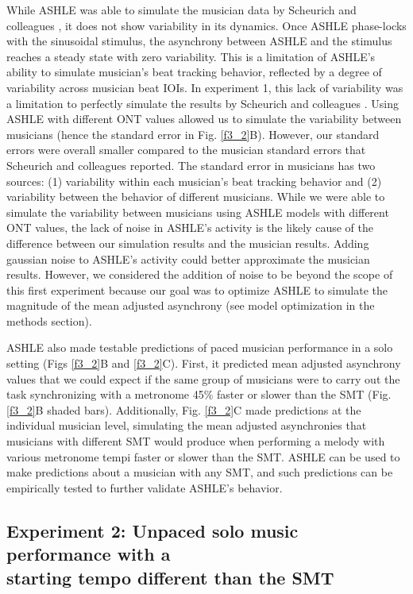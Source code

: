 \documentclass{report}
\begin{document}
While ASHLE was able to simulate the musician data by Scheurich and colleagues \cite{scheurich2018tapping}, it does not show variability in its dynamics. Once ASHLE phase-locks with the sinusoidal stimulus, the asynchrony between ASHLE and the stimulus reaches a steady state with zero variability. This is a limitation of ASHLE's ability to simulate musician's beat tracking behavior, reflected by a degree of variability across musician beat IOIs. In experiment 1, this lack of variability was a limitation to perfectly simulate the results by Scheurich and colleagues \cite{scheurich2018tapping}. Using ASHLE with different ONT values allowed us to simulate the variability between musicians (hence the standard error in Fig.{} \ref{f3_2}B). However, our standard errors were overall smaller compared to the musician standard errors that Scheurich and colleagues \cite{scheurich2018tapping} reported. The standard error in musicians has two sources: (1) variability within each musician's beat tracking behavior and (2) variability between the behavior of different musicians. While we were able to simulate the variability between musicians using ASHLE models with different ONT values, the lack of noise in ASHLE's activity is the likely cause of the difference between our simulation results and the musician results. Adding gaussian noise to ASHLE's activity could better approximate the musician results. However, we considered the addition of noise to be beyond the scope of this first experiment because our goal was to optimize ASHLE to simulate the magnitude of the mean adjusted asynchrony (see model optimization in the methods section).

ASHLE also made testable predictions of paced musician performance in a solo setting (Figs \ref{f3_2}B and \ref{f3_2}C). First, it predicted mean adjusted asynchrony values that we could expect if the same group of musicians were to carry out the task synchronizing with a metronome 45\% faster or slower than the SMT (Fig.{} \ref{f3_2}B shaded bars). Additionally, Fig.{} \ref{f3_2}C made predictions at the individual musician level, simulating the mean adjusted asynchronies that musicians with different SMT would produce when performing a melody with various metronome tempi faster or slower than the SMT. ASHLE can be used to make predictions about a musician with any SMT, and such predictions can be empirically tested to further validate ASHLE's behavior.

\subsection{Experiment 2: Unpaced solo music performance with a \\ starting tempo different than the SMT}
\end{document}
